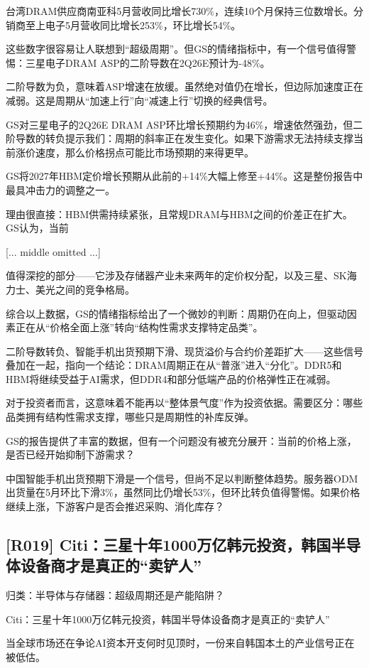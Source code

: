 \documentclass[11pt]{ctexart}
\begin{document}
台湾DRAM供应商南亚科5月营收同比增长730\%，连续10个月保持三位数增长。分销商至上电子5月营收同比增长253\%，环比增长54\%。

这些数字很容易让人联想到“超级周期”。但GS的情绪指标中，有一个信号值得警惕：三星电子DRAM ASP的二阶导数在2Q26E预计为-48\%。

二阶导数为负，意味着ASP增速在放缓。虽然绝对值仍在增长，但边际加速度正在减弱。这是周期从“加速上行”向“减速上行”切换的经典信号。

GS对三星电子的2Q26E DRAM ASP环比增长预期约为46\%，增速依然强劲，但二阶导数的转负提示我们：周期的斜率正在发生变化。如果下游需求无法持续支撑当前涨价速度，那么价格拐点可能比市场预期的来得更早。

GS将2027年HBM定价增长预期从此前的+14\%大幅上修至+44\%。这是整份报告中最具冲击力的调整之一。

理由很直接：HBM供需持续紧张，且常规DRAM与HBM之间的价差正在扩大。GS认为，当前

[... middle omitted ...]

值得深挖的部分——它涉及存储器产业未来两年的定价权分配，以及三星、SK海力士、美光之间的竞争格局。

综合以上数据，GS的情绪指标给出了一个微妙的判断：周期仍在向上，但驱动因素正在从“价格全面上涨”转向“结构性需求支撑特定品类”。

二阶导数转负、智能手机出货预期下滑、现货溢价与合约价差距扩大——这些信号叠加在一起，指向一个结论：DRAM周期正在从“普涨”进入“分化”。DDR5和HBM将继续受益于AI需求，但DDR4和部分低端产品的价格弹性正在减弱。

对于投资者而言，这意味着不能再以“整体景气度”作为投资依据。需要区分：哪些品类拥有结构性需求支撑，哪些只是周期性的补库反弹。

GS的报告提供了丰富的数据，但有一个问题没有被充分展开：当前的价格上涨，是否已经开始抑制下游需求？

中国智能手机出货预期下滑是一个信号，但尚不足以判断整体趋势。服务器ODM出货量在5月环比下滑3\%，虽然同比仍增长53\%，但环比转负值得警惕。如果价格继续上涨，下游客户是否会推迟采购、消化库存？

\subsection{[R019] Citi：三星十年1000万亿韩元投资，韩国半导体设备商才是真正的“卖铲人”}
{\small\color{refgray}归类：半导体与存储器：超级周期还是产能陷阱？}

Citi：三星十年1000万亿韩元投资，韩国半导体设备商才是真正的“卖铲人”

当全球市场还在争论AI资本开支何时见顶时，一份来自韩国本土的产业信号正在被低估。
\end{document}
